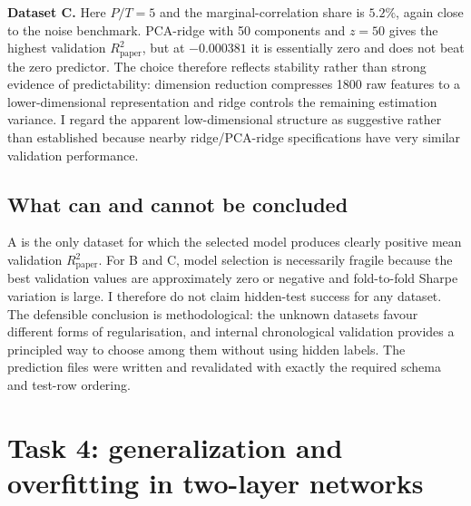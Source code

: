 \documentclass[11pt,a4paper]{article}
\newcommand{\code}[1]{\path{#1}}
\newcommand{\Rpaper}{R^2_{\mathrm{paper}}}
\begin{document}
\textbf{Dataset C.} Here $P/T=5$ and the marginal-correlation share is $5.2\%$, again close to the noise benchmark. PCA-ridge with 50 components and $z=50$ gives the highest validation $\Rpaper$, but at $-0.000381$ it is essentially zero and does not beat the zero predictor. The choice therefore reflects stability rather than strong evidence of predictability: dimension reduction compresses 1800 raw features to a lower-dimensional representation and ridge controls the remaining estimation variance. I regard the apparent low-dimensional structure as suggestive rather than established because nearby ridge/PCA-ridge specifications have very similar validation performance.

\subsection{What can and cannot be concluded}
A is the only dataset for which the selected model produces clearly positive mean validation $\Rpaper$. For B and C, model selection is necessarily fragile because the best validation values are approximately zero or negative and fold-to-fold Sharpe variation is large. I therefore do not claim hidden-test success for any dataset. The defensible conclusion is methodological: the unknown datasets favour different forms of regularisation, and internal chronological validation provides a principled way to choose among them without using hidden labels. The prediction files were written and revalidated with exactly the required \code{t,yhat} schema and test-row ordering.

\section{Task 4: generalization and overfitting in two-layer networks}\label{sec:task4}
\end{document}
